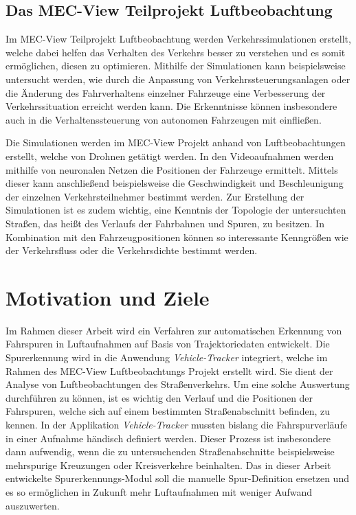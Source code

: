 \subsection{Das MEC-View Teilprojekt Luftbeobachtung}
\label{sec:mecview_sim}

Im MEC-View Teilprojekt Luftbeobachtung werden Verkehrssimulationen erstellt, welche dabei helfen
das Verhalten des Verkehrs besser zu verstehen und es somit ermöglichen, diesen zu optimieren.
Mithilfe der Simulationen kann beispielsweise untersucht werden, wie durch die Anpassung von Verkehrssteuerungsanlagen
oder die Änderung des Fahrverhaltens einzelner Fahrzeuge eine Verbesserung der Verkehrssituation erreicht werden kann.
Die Erkenntnisse können insbesondere auch in die Verhaltenssteuerung von autonomen Fahrzeugen mit einfließen.

Die Simulationen werden im MEC-View Projekt anhand von Luftbeobachtungen erstellt, welche von Drohnen getätigt werden.
In den Videoaufnahmen werden mithilfe von neuronalen Netzen die Positionen der Fahrzeuge ermittelt. Mittels dieser
kann anschließend beispielsweise die Geschwindigkeit und Beschleunigung der einzelnen Verkehrsteilnehmer bestimmt werden.
Zur Erstellung der Simulationen ist es zudem wichtig, eine Kenntnis der Topologie der untersuchten Straßen, das heißt des
Verlaufs der Fahrbahnen und Spuren, zu besitzen. In Kombination mit den Fahrzeugpositionen können so interessante
Kenngrößen wie der Verkehrsfluss oder die Verkehrsdichte bestimmt werden.

\section{Motivation und Ziele}
\label{sec:motivation_goals}

Im Rahmen dieser Arbeit wird ein Verfahren zur automatischen Erkennung von Fahrspuren in Luftaufnahmen
auf Basis von Trajektoriedaten entwickelt. Die Spurerkennung wird in die Anwendung \textit{Vehicle-Tracker}
integriert, welche im Rahmen des MEC-View Luftbeobachtungs Projekt erstellt wird. Sie dient der Analyse
von Luftbeobachtungen des Straßenverkehrs. Um eine solche Auswertung durchführen zu können, ist es wichtig
den Verlauf und die Positionen der Fahrspuren, welche sich auf einem bestimmten Straßenabschnitt befinden,
zu kennen. In der Applikation \textit{Vehicle-Tracker} mussten bislang die Fahrspurverläufe in einer Aufnahme
händisch definiert werden. Dieser Prozess ist insbesondere dann aufwendig, wenn die zu untersuchenden
Straßenabschnitte beispielsweise mehrspurige Kreuzungen oder Kreisverkehre beinhalten. Das in dieser Arbeit
entwickelte Spurerkennungs-Modul soll die manuelle Spur-Definition ersetzen und es so ermöglichen
in Zukunft mehr Luftaufnahmen mit weniger Aufwand auszuwerten.

